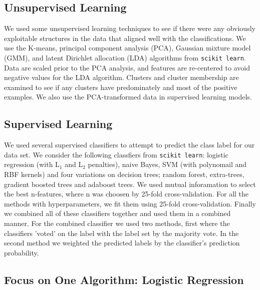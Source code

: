 \subsection{Unsupervised Learning}
We used some unsupervised learning techniques to see if there were any obviously exploitable structures in the data that aligned well with the classifications.  We use the K-means, principal component analysis (PCA), Gaussian mixture model (GMM), and latent Dirichlet allocation (LDA) algorithms from \texttt{scikit learn}\cite{scikit-learn}.  Data are scaled prior to the PCA analysis, and features are re-centered to avoid negative values for the LDA algorithm.  Clusters and cluster membership are examined to see if any clusters have predominately and most of the positive examples. We also use the PCA-transformed data in supervised learning models.




\subsection{Supervised Learning}
We used several supervised classifiers to attempt to predict the class label for our data set. We consider the following classfiers from \texttt{scikit learn}\cite{scikit-learn}: logistic regression (with L$_1$ and L$_2$ penalties), naive Bayes, SVM (with polynomail and RBF kernels) and four variations on decision trees; random forest, extra-trees, gradient boosted trees and adaboost trees. We used mutual inforamation to select the best n-features, where n was choosen by 25-fold cross-validation. For all the methods with hyperparameters, we fit them using 25-fold cross-validation. Finally we combined all of these classifiers together and used them in a combined manner. For the combined classifier we used two methods, first where the classifiers 'voted' on the label with the label set by the majority vote. In the second method we weighted the predicted labels by the classifier's prediction probability.





\subsection{Focus on One Algorithm: Logistic Regression}

